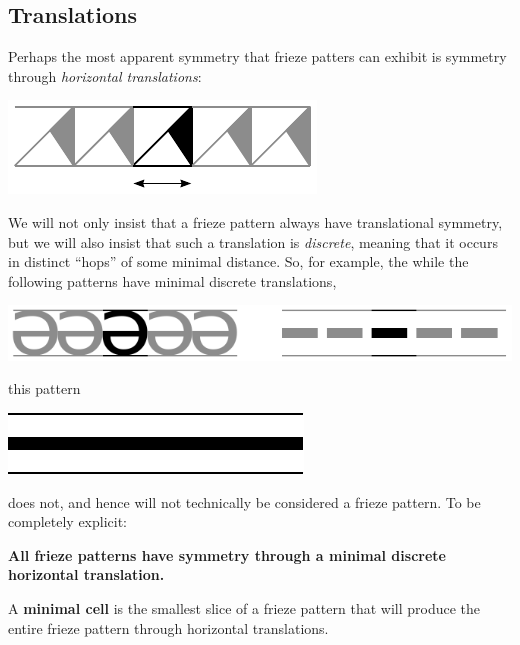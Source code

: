 \subsection*{Translations}

Perhaps the most apparent symmetry that frieze patters can exhibit is
symmetry through \textit{horizontal translations}:
\begin{center}
\includegraphics{../graphics/fptrans.pdf}
\end{center}
We will not only insist that a frieze pattern always have
translational symmetry, but we will also insist that such a
translation is \textit{discrete}, meaning that it occurs in distinct
``hops'' of some minimal distance. So, for example, the while the
following patterns have minimal discrete translations, 
\begin{center}
\includegraphics{../graphics/fptransDis.pdf}
\end{center}
this pattern
\begin{center}
\includegraphics{../graphics/fptransNot.pdf}
\end{center}
does not, and hence will not technically be considered a frieze
pattern. To be completely explicit: 
\begin{center}
\textbf{All frieze patterns have symmetry through a minimal discrete
  horizontal translation.}
\end{center}
\begin{dfn}
A \textbf{minimal cell} is the smallest slice of a frieze
pattern that will produce the entire frieze pattern through horizontal
translations.
\end{dfn}

